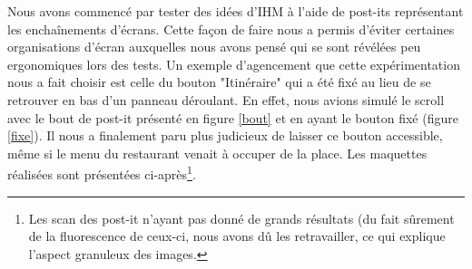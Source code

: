 Nous avons commencé par tester des idées d'IHM à l'aide de post-its
représentant les enchaînements d'écrans. Cette façon de faire nous a
permis d'éviter certaines organisations d'écran auxquelles nous avons
pensé qui se sont révélées peu ergonomiques lors des tests. Un exemple
d'agencement que cette expérimentation nous a fait choisir est celle du
bouton "Itinéraire" qui a été fixé au lieu de se retrouver en bas d'un
panneau déroulant. En effet, nous avions simulé le scroll avec le bout
de post-it présenté en figure \ref{bout} et en ayant le bouton fixé
(figure \ref{fixe}). Il nous a finalement paru plus judicieux de laisser ce
bouton accessible, même si le menu du restaurant venait à occuper de la
place. Les maquettes réalisées sont présentées ci-après\footnote{Les
scan des post-it n'ayant pas donné de grands résultats (du fait sûrement
de la fluorescence de ceux-ci, nous avons dû les retravailler, ce qui
explique l'aspect granuleux des images.}.


